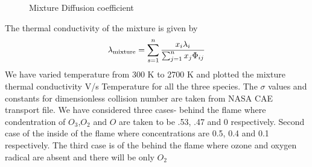 \begin{figure}[H]
        \quad
    \caption{Mixture Diffusion coefficient}
\end{figure}


\noindent The thermal conductivity of the mixture is given by 
\begin{equation}
\lambda_{\textnormal{mixture}} = \sum_{s=1}^{n} \frac {x_i \lambda_i}{\sum_{j=1}^{n} x_j \Phi_{ij}}
\end{equation}
\noindent  We have varied temperature from 300 K to 2700 K and plotted the mixture thermal conductivity V/s Temperature for all the  three species. The $\sigma$ values and constants for dimensionless collision number are taken from NASA CAE transport file. We have considered three cases-  behind the flame where condentration of $O_3$,$O_2$ and $O$ are taken to be .53, .47 and 0 respectively. Second case of the inside of the flame where concentrations are 0.5, 0.4 and 0.1 respectively. The third case is of the behind the flame where ozone and oxygen radical are absent and there will be only $O_2$


